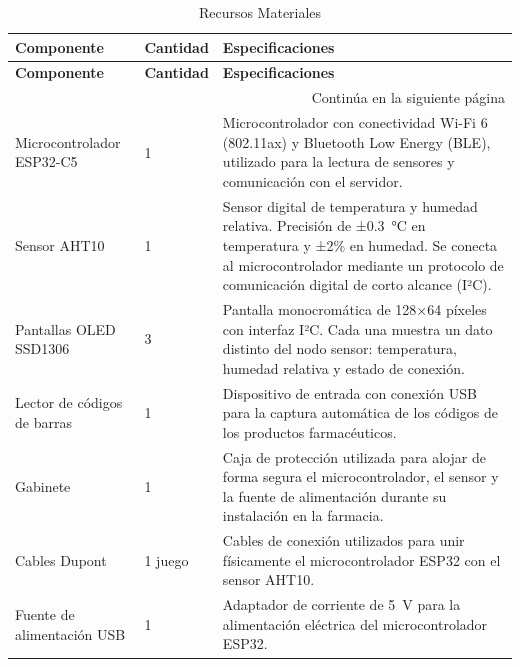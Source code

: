 \begin{longtable}{|p{3.5cm}|p{2.5cm}|p{8cm}|}

\caption{Recursos Materiales} \label{tab:recursos_materiales} \\

\hline
\rowcolor{gray!20}
\textbf{Componente} & \textbf{Cantidad} & \textbf{Especificaciones} \\
\hline
\endfirsthead

\hline
\rowcolor{gray!20}
\textbf{Componente} & \textbf{Cantidad} & \textbf{Especificaciones} \\
\hline
\endhead

\hline
\multicolumn{3}{|r|}{\small Continúa en la siguiente página} \\
\hline
\endfoot

\hline
\endlastfoot

Microcontrolador ESP32-C5 & 1 &
Microcontrolador con conectividad Wi-Fi 6 (802.11ax) y Bluetooth Low Energy (BLE), utilizado para la lectura de sensores y comunicación con el servidor. \\
\hline

Sensor AHT10 & 1 &
Sensor digital de temperatura y humedad relativa. Precisión de ±0.3~°C en temperatura y ±2\% en humedad. Se conecta al microcontrolador mediante un protocolo de comunicación digital de corto alcance (I²C). \\
\hline

Pantallas OLED SSD1306 & 3 &
Pantalla monocromática de 128×64 píxeles con interfaz I²C. Cada una muestra un dato distinto del nodo sensor: temperatura, humedad relativa y estado de conexión. \\
\hline

Lector de códigos de barras & 1 &
Dispositivo de entrada con conexión USB para la captura automática de los códigos de los productos farmacéuticos. \\
\hline

Gabinete & 1 &
Caja de protección utilizada para alojar de forma segura el microcontrolador, el sensor y la fuente de alimentación durante su instalación en la farmacia. \\
\hline

Cables Dupont & 1 juego &
Cables de conexión utilizados para unir físicamente el microcontrolador ESP32 con el sensor AHT10. \\
\hline

Fuente de alimentación USB & 1 &
Adaptador de corriente de 5~V para la alimentación eléctrica del microcontrolador ESP32. \\
\hline


\end{longtable}

